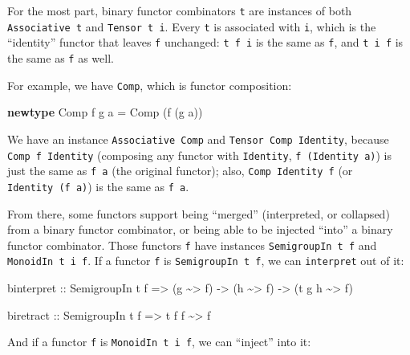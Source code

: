 \documentclass[]{article}
\newenvironment{Shaded}{}{}
\newcommand{\DataTypeTok}[1]{\textcolor[rgb]{0.56,0.13,0.00}{#1}}
\newcommand{\KeywordTok}[1]{\textcolor[rgb]{0.00,0.44,0.13}{\textbf{#1}}}
\newcommand{\NormalTok}[1]{#1}
\newcommand{\OperatorTok}[1]{\textcolor[rgb]{0.40,0.40,0.40}{#1}}
\newcommand{\OtherTok}[1]{\textcolor[rgb]{0.00,0.44,0.13}{#1}}
\begin{document}
For the most part, binary functor combinators \texttt{t} are instances of both
\texttt{Associative\ t} and \texttt{Tensor\ t\ i}. Every \texttt{t} is
associated with \texttt{i}, which is the ``identity'' functor that leaves
\texttt{f} unchanged: \texttt{t\ f\ i} is the same as \texttt{f}, and
\texttt{t\ i\ f} is the same as \texttt{f} as well.

For example, we have \texttt{Comp}, which is functor composition:

\begin{Shaded}
\begin{Highlighting}[]
\KeywordTok{newtype} \DataTypeTok{Comp}\NormalTok{ f g a }\OtherTok{=} \DataTypeTok{Comp}\NormalTok{ (f (g a))}
\end{Highlighting}
\end{Shaded}

We have an instance \texttt{Associative\ Comp} and
\texttt{Tensor\ Comp\ Identity}, because \texttt{Comp\ f\ Identity} (composing
any functor with \texttt{Identity}, \texttt{f\ (Identity\ a)}) is just the same
as \texttt{f\ a} (the original functor); also, \texttt{Comp\ Identity\ f} (or
\texttt{Identity\ (f\ a)}) is the same as \texttt{f\ a}.

From there, some functors support being ``merged'' (interpreted, or collapsed)
from a binary functor combinator, or being able to be injected ``into'' a binary
functor combinator. Those functors \texttt{f} have instances
\texttt{SemigroupIn\ t\ f} and \texttt{MonoidIn\ t\ i\ f}. If a functor
\texttt{f} is \texttt{SemigroupIn\ t\ f}, we can \texttt{interpret} out of it:

\begin{Shaded}
\begin{Highlighting}[]
\NormalTok{binterpret}
\OtherTok{    ::} \DataTypeTok{SemigroupIn}\NormalTok{ t f}
    \OtherTok{=\textgreater{}}\NormalTok{ (g }\OperatorTok{\textasciitilde{}\textgreater{}}\NormalTok{ f)}
    \OtherTok{{-}\textgreater{}}\NormalTok{ (h }\OperatorTok{\textasciitilde{}\textgreater{}}\NormalTok{ f)}
    \OtherTok{{-}\textgreater{}}\NormalTok{ (t g h }\OperatorTok{\textasciitilde{}\textgreater{}}\NormalTok{ f)}

\NormalTok{biretract}
\OtherTok{    ::} \DataTypeTok{SemigroupIn}\NormalTok{ t f}
    \OtherTok{=\textgreater{}}\NormalTok{ t f f }\OperatorTok{\textasciitilde{}\textgreater{}}\NormalTok{ f}
\end{Highlighting}
\end{Shaded}

And if a functor \texttt{f} is \texttt{MonoidIn\ t\ i\ f}, we can ``inject''
into it:
\end{document}
